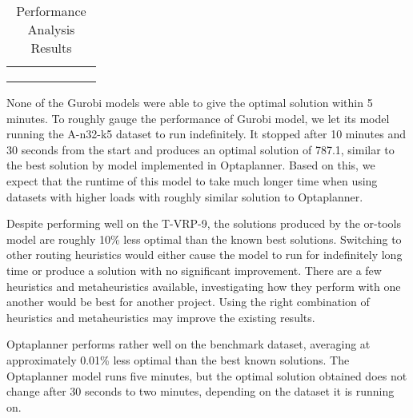 \begin{table}[!ht]
\begin{tabular}{|l|l|l|l|l|l|l|}
                                                                                                                              &                         &                         &                               &                         &                          &                         \\
                                                                                                                              &                         &                         &                               &                         &                          &                         \\
                                                                                                                              &                         &                         &                               &                         &                          &                         \\ \hline
\end{tabular}
\caption{Performance Analysis Results}
\label{table:results}
\end{table}

None of the Gurobi models were able to give the optimal solution within 5 minutes. To roughly gauge the performance of Gurobi model,
we let its model running the A-n32-k5 dataset to run indefinitely. It stopped after 10 minutes and 30 seconds from the start and produces an optimal solution of
787.1, similar to the best solution by model implemented in Optaplanner. Based on this, we expect that the runtime of this model to take much longer time
when using datasets with higher loads with roughly similar solution to Optaplanner.

Despite performing well on the T-VRP-9, the solutions produced by the or-tools model are roughly
10\% less optimal than the known best solutions. Switching to other routing heuristics would either cause the model to run
 for indefinitely long time or produce a solution with no significant improvement.
There are a few heuristics and metaheuristics available, investigating how they perform with one another would be best for
another project. Using the right combination of heuristics and metaheuristics may improve the existing results.

Optaplanner performs rather well on the benchmark dataset, averaging at approximately 0.01\% less optimal than the best
known solutions. The Optaplanner model runs five minutes, but the optimal solution obtained does not change after
30 seconds to two minutes, depending on the dataset it is running on.

